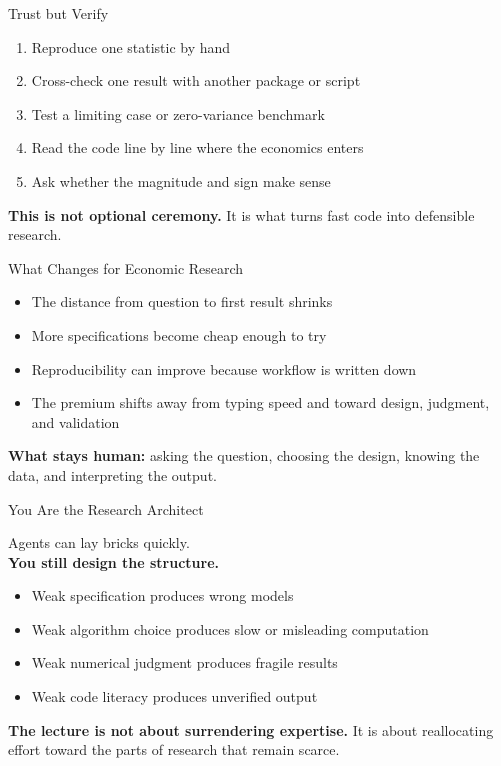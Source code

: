 \documentclass[10pt,english,aspectratio=169]{beamer}
\begin{document}
\begin{frame}{Trust but Verify}
\begin{enumerate}
    \item Reproduce one statistic by hand
    \item Cross-check one result with another package or script
    \item Test a limiting case or zero-variance benchmark
    \item Read the code line by line where the economics enters
    \item Ask whether the magnitude and sign make sense
\end{enumerate}

\vspace{0.3cm}

\textbf{This is not optional ceremony.} It is what turns fast code into defensible research.
\end{frame}

\begin{frame}{What Changes for Economic Research}
\begin{itemize}
    \item The distance from question to first result shrinks
    \item More specifications become cheap enough to try
    \item Reproducibility can improve because workflow is written down
    \item The premium shifts away from typing speed and toward design, judgment, and validation
\end{itemize}

\vspace{0.3cm}

\textbf{What stays human:} asking the question, choosing the design, knowing the data, and interpreting the output.
\end{frame}

\begin{frame}{You Are the Research Architect}
\begin{center}
\Large
Agents can lay bricks quickly.\\
\textbf{You still design the structure.}
\end{center}

\vspace{0.35cm}

\begin{itemize}
    \item Weak specification produces wrong models
    \item Weak algorithm choice produces slow or misleading computation
    \item Weak numerical judgment produces fragile results
    \item Weak code literacy produces unverified output
\end{itemize}

\vspace{0.25cm}

\textbf{The lecture is not about surrendering expertise.} It is about reallocating effort toward the parts of research that remain scarce.
\end{frame}
\end{document}
